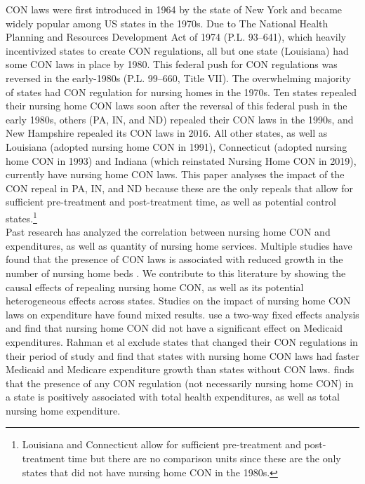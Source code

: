 \documentclass[../Main.tex]{subfiles}
\begin{document}
CON laws were first introduced in 1964 by the state of New York and became widely popular among US states in the 1970s. Due to The National Health Planning and Resources Development Act of 1974 (P.L. 93–641), which heavily incentivized states to create CON regulations, all but one state (Louisiana) had some CON laws in place by 1980. This federal push for CON regulations was reversed in the early-1980s (P.L. 99–660, Title VII). The overwhelming majority of states had CON regulation for nursing homes in the 1970s. Ten states repealed their nursing home CON laws soon after the reversal of this federal push in the early 1980s, others (PA, IN, and ND) repealed their CON laws in the 1990s, and New Hampshire repealed its CON laws in 2016. All other states, as well as Louisiana (adopted nursing home CON in 1991), Connecticut (adopted nursing home CON in 1993) and Indiana (which reinstated Nursing Home CON in 2019), currently have nursing home CON laws. This paper analyses the impact of the CON repeal in PA, IN, and ND because these are the only repeals that allow for sufficient pre-treatment and post-treatment time, as well as potential control states.\footnote{Louisiana and Connecticut allow for sufficient pre-treatment and post-treatment time but there are no comparison units since these are the only states that did not have nursing home CON in the 1980s.} \\
\indent Past research has analyzed the correlation between nursing home CON and expenditures, as well as quantity of nursing home services. Multiple studies have found that the presence of CON laws is associated with reduced growth in the number of nursing home beds \citep{harrington1997effect,swan1991certificate,zinn1994market}. We contribute to this literature by showing the causal effects of repealing nursing home CON, as well as its potential heterogeneous effects across states. Studies on the impact of nursing home CON laws on expenditure have found mixed results. \citet{grabowski2003effects} use a two-way fixed effects analysis and find that nursing home CON did not have a significant effect on Medicaid expenditures. Rahman et al \citet{rahman2016impact} exclude states that changed their CON regulations in their period of study and find that states with nursing home CON laws had faster Medicaid and Medicare expenditure growth than states without CON laws. \citet{bailey2019can} finds that the presence of any CON regulation (not necessarily nursing home CON) in a state is positively associated with total health expenditures, as well as total nursing home expenditure.\\
\end{document}
